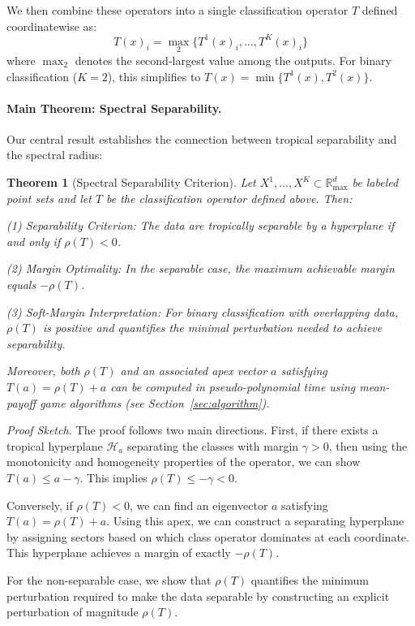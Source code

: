 \documentclass{article}
\newtheorem{theorem}{Theorem}
\newcommand{\Rmax}{\mathbb{R}_{\max}}
\begin{document}
We then combine these operators into a single classification operator $T$ defined coordinatewise as:
\[
T(x)_i = \operatorname{\max}_2\{T^1(x)_i, \dots, T^K(x)_i\}
\]
where $\operatorname{\max}_2$ denotes the second-largest value among the outputs. For binary classification ($K=2$), this simplifies to $T(x)=\min\{T^1(x), T^2(x)\}$.

\paragraph{Main Theorem: Spectral Separability.}
Our central result establishes the connection between tropical separability and the spectral radius:

\begin{theorem}[Spectral Separability Criterion]\label{thm:spectral_separability}
Let $X^1,\ldots,X^K \subset \Rmax^d$ be labeled point sets and let $T$ be the classification operator defined above. Then:

(1) \textit{Separability Criterion:} The data are tropically separable by a hyperplane if and only if $\rho(T) < 0$.

(2) \textit{Margin Optimality:} In the separable case, the maximum achievable margin equals $-\rho(T)$.

(3) \textit{Soft-Margin Interpretation:} For binary classification with overlapping data, $\rho(T)$ is positive and quantifies the minimal perturbation needed to achieve separability.

Moreover, both $\rho(T)$ and an associated apex vector $a$ satisfying $T(a) = \rho(T)+a$ can be computed in pseudo-polynomial time using mean-payoff game algorithms (see Section~\ref{sec:algorithm}).
\end{theorem}

\emph{Proof Sketch.}
The proof follows two main directions. First, if there exists a tropical hyperplane $\mathcal{H}_a$ separating the classes with margin $\gamma>0$, then using the monotonicity and homogeneity properties of the operator, we can show $T(a) \leq a - \gamma$. This implies $\rho(T) \leq -\gamma < 0$.

Conversely, if $\rho(T)<0$, we can find an eigenvector $a$ satisfying $T(a)=\rho(T)+a$. Using this apex, we can construct a separating hyperplane by assigning sectors based on which class operator dominates at each coordinate. This hyperplane achieves a margin of exactly $-\rho(T)$.

For the non-separable case, we show that $\rho(T)$ quantifies the minimum perturbation required to make the data separable by constructing an explicit perturbation of magnitude $\rho(T)$.
\end{document}
